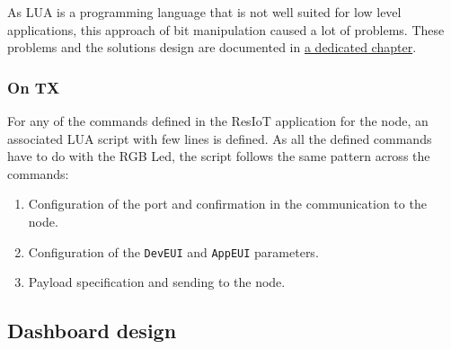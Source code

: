 As LUA is a programming language that is not well suited for low level applications, this approach of bit manipulation caused a lot of problems. These problems and the solutions design are documented in \hyperref[problems]{a dedicated chapter}.

\subsubsection*{On TX}

For any of the commands defined in the ResIoT application for the node, an associated LUA script with few lines is defined. As all the defined commands have to do with the RGB Led, the script follows the same pattern across the commands:
\begin{enumerate}
    \item Configuration of the port and confirmation in the communication to the node.
    \item Configuration of the \texttt{DevEUI} and \texttt{AppEUI} parameters.
    \item Payload specification and sending to the node.
\end{enumerate}
\clearpage
\subsection{Dashboard design}
\clearpage